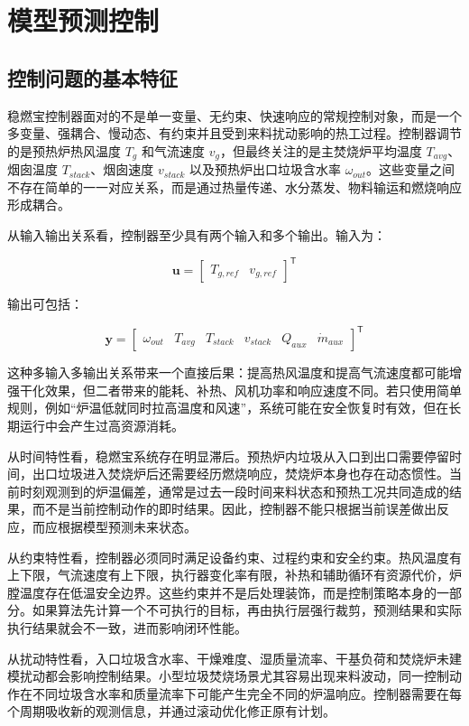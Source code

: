 \documentclass[UTF8,openany,zihao=-4,oneside]{ctexbook}
\begin{document}
\chapter{模型预测控制}\label{chap:mpc-background}

\section{控制问题的基本特征}\label{sec:control-problem-features}

稳燃宝控制器面对的不是单一变量、无约束、快速响应的常规控制对象，而是一个多变量、强耦合、慢动态、有约束并且受到来料扰动影响的热工过程。控制器调节的是预热炉热风温度 \(T_g\) 和气流速度 \(v_g\)，但最终关注的是主焚烧炉平均温度 \(T_{avg}\)、烟囱温度 \(T_{stack}\)、烟囱速度 \(v_{stack}\) 以及预热炉出口垃圾含水率 \(\omega_{out}\)。这些变量之间不存在简单的一一对应关系，而是通过热量传递、水分蒸发、物料输运和燃烧响应形成耦合。

从输入输出关系看，控制器至少具有两个输入和多个输出。输入为：

\[
\mathbf{u}=\begin{bmatrix}T_{g,ref} & v_{g,ref}\end{bmatrix}^\mathsf{T}
\]

输出可包括：

\[
\mathbf{y}=\begin{bmatrix}\omega_{out} & T_{avg} & T_{stack} & v_{stack} & Q_{aux} & \dot m_{aux}\end{bmatrix}^\mathsf{T}
\]

这种多输入多输出关系带来一个直接后果：提高热风温度和提高气流速度都可能增强干化效果，但二者带来的能耗、补热、风机功率和响应速度不同。若只使用简单规则，例如“炉温低就同时拉高温度和风速”，系统可能在安全恢复时有效，但在长期运行中会产生过高资源消耗。

从时间特性看，稳燃宝系统存在明显滞后。预热炉内垃圾从入口到出口需要停留时间，出口垃圾进入焚烧炉后还需要经历燃烧响应，焚烧炉本身也存在动态惯性。当前时刻观测到的炉温偏差，通常是过去一段时间来料状态和预热工况共同造成的结果，而不是当前控制动作的即时结果。因此，控制器不能只根据当前误差做出反应，而应根据模型预测未来状态。

从约束特性看，控制器必须同时满足设备约束、过程约束和安全约束。热风温度有上下限，气流速度有上下限，执行器变化率有限，补热和辅助循环有资源代价，炉膛温度存在低温安全边界。这些约束并不是后处理装饰，而是控制策略本身的一部分。如果算法先计算一个不可执行的目标，再由执行层强行裁剪，预测结果和实际执行结果就会不一致，进而影响闭环性能。

从扰动特性看，入口垃圾含水率、干燥难度、湿质量流率、干基负荷和焚烧炉未建模扰动都会影响控制结果。小型垃圾焚烧场景尤其容易出现来料波动，同一控制动作在不同垃圾含水率和质量流率下可能产生完全不同的炉温响应。控制器需要在每个周期吸收新的观测信息，并通过滚动优化修正原有计划。
\end{document}
